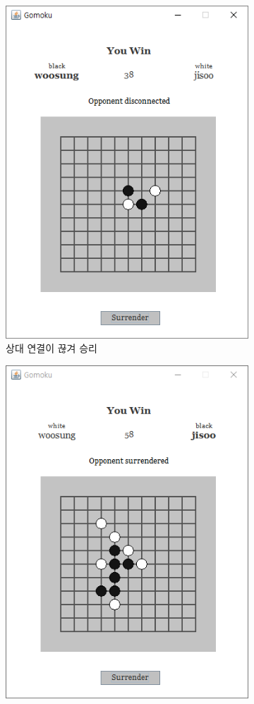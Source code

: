 \documentclass[a4paper, 10pt]{article}
\begin{document}
\begin{figure}[h]
\begin{subfigure}{.24\textwidth}
    \includegraphics[width=.9\linewidth]{resource/disconnected}
    \caption{상대 연결이 끊겨 승리}
    \label{fig:win}
  \end{subfigure}
  \begin{subfigure}{.24\textwidth}
    \centering
    \includegraphics[width=.9\linewidth]{resource/surrender}

\end{subfigure}
\end{figure}
\end{document}
